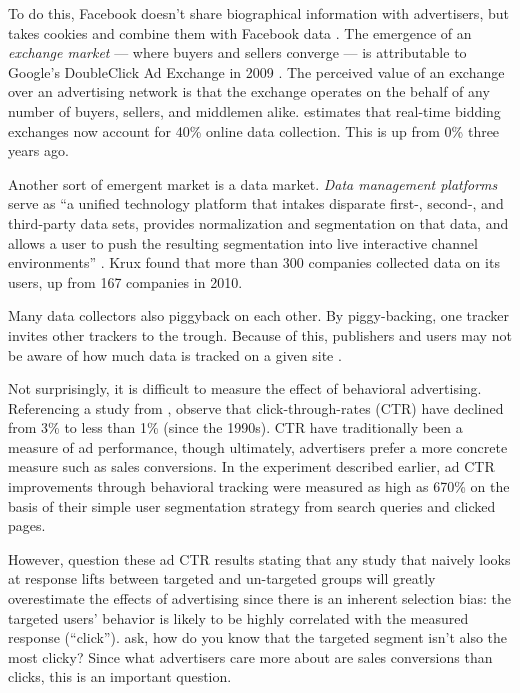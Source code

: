 To do this, Facebook doesn't share biographical information with advertisers, but takes cookies and combine them with Facebook data  \citep{Constine:ut}. 
The emergence of an \emph{exchange market} --- where buyers and sellers converge --- is attributable to Google's DoubleClick Ad Exchange in 2009  \citep{Duggal:2012tq}.  The perceived value of an exchange over an advertising network is that the exchange operates on the behalf of any number of buyers, sellers, and middlemen alike.  \cite{Anonymous:2012uw}  estimates that real-time bidding exchanges now account for 40\% online data collection. This is up from 0\% three years ago.

Another sort of emergent market is a data market. \emph{Data management platforms} serve as ``a unified technology platform that intakes disparate first-, second-, and third-party data sets, provides normalization and segmentation on that data, and allows a user to push the resulting segmentation into live interactive channel environments''  \citep{OConnell:2011tq}.  Krux  \citeyearpar{Anonymous:2012uw}  found that more than 300 companies collected data on its users, up from 167 companies in 2010. 

Many data collectors also piggyback on each other. By piggy-backing, one tracker invites other trackers to the trough. Because of this, publishers and users may not be aware of how much data is tracked on a given site  \citep{Angwin:2012tg}. 

Not surprisingly, it is difficult to measure the effect of behavioral advertising. Referencing a study from  \cite{Kazienko:2007tb}, \cite{Farahat:2012ex}  observe that click-through-rates (CTR) have declined from 3\% to less than 1\% (since the 1990s). CTR have traditionally been a measure of ad performance, though ultimately, advertisers prefer a more concrete measure such as sales conversions. In the  \cite{Yan:2009dk}  experiment described earlier, ad CTR improvements through behavioral tracking were measured as high as 670\% on the basis of their simple user segmentation strategy from search queries and clicked pages.

However,  \cite{Farahat:2012ex}  question these ad CTR results stating that any study that naively looks at response lifts between targeted and un-targeted groups will greatly overestimate the effects of advertising since there is an inherent selection bias: the targeted users' behavior is likely to be highly correlated with the measured response (``click'').  \cite{Farahat:2012ex}  ask, how do you know that the targeted segment isn't also the most clicky? Since what advertisers care more about are sales conversions than clicks, this is an important question.

